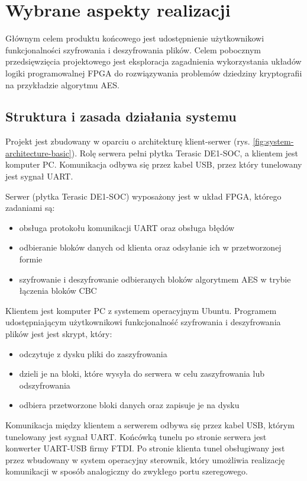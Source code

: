\section{Wybrane aspekty realizacji}
\label{sec:wybrane-aspekty-realizacji}


Głównym celem produktu końcowego jest udostępnienie użytkownikowi funkcjonalności szyfrowania i deszyfrowania plików. Celem pobocznym przedsięwzięcia projektowego jest eksploracja zagadnienia wykorzystania układów logiki programowalnej FPGA do rozwiązywania problemów dziedziny kryptografii na przykładzie algorytmu AES.

\subsection {Struktura i zasada działania systemu}
Projekt jest zbudowany w oparciu o architekturę klient-serwer (rys. \ref{fig:system-architecture-basic}). Rolę serwera pełni płytka Terasic DE1-SOC, a klientem jest komputer PC. Komunikacja odbywa się przez kabel USB, przez który tunelowany jest sygnał UART.

Serwer (płytka Terasic DE1-SOC) wyposażony jest w układ FPGA, którego zadaniami są:
\begin{itemize}
\item obsługa protokołu komunikacji UART oraz obsługa błędów
\item odbieranie bloków danych od klienta oraz odsyłanie ich w przetworzonej formie
\item szyfrowanie i deszyfrowanie odbieranych bloków algorytmem AES w trybie łączenia bloków CBC
\end{itemize}

Klientem jest komputer PC z systemem operacyjnym Ubuntu. Programem udostępniającym użytkownikowi funkcjonalność szyfrowania i deszyfrowania plików jest jest skrypt, który:
\begin{itemize}
\item odczytuje z dysku pliki do zaszyfrowania
\item dzieli je na bloki, które wysyła do serwera w celu zaszyfrowania lub odszyfrowania
\item odbiera przetworzone bloki danych oraz zapisuje je na dysku 
\end{itemize}

Komunikacja między klientem a serwerem odbywa się przez kabel USB, którym tunelowany jest sygnał UART. Końcówką tunelu po stronie serwera jest konwerter UART-USB firmy FTDI. Po stronie klienta tunel obsługiwany jest przez wbudowany w system operacyjny sterownik, który umożliwia realizację komunikacji w sposób analogiczny do zwykłego portu szeregowego.

